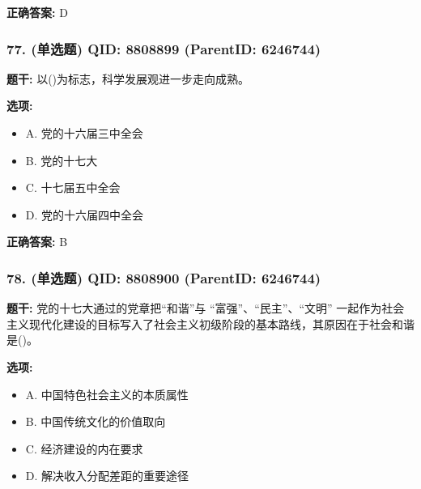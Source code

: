 \documentclass[12pt,UTF8]{ctexart}
\begin{document}
\textbf{正确答案:}
D

\vspace{0.3em}\hrulefill\vspace{0.7em}

\subsubsection*{77. (单选题) \small QID: 8808899 (ParentID: 6246744)}

\textbf{题干:}
以()为标志，科学发展观进一步走向成熟。



\textbf{选项:}
\begin{itemize}[leftmargin=*]

  \item A. 党的十六届三中全会

  \item B. 党的十七大

  \item C. 十七届五中全会

  \item D. 党的十六届四中全会

\end{itemize}

\textbf{正确答案:}
B

\vspace{0.3em}\hrulefill\vspace{0.7em}

\subsubsection*{78. (单选题) \small QID: 8808900 (ParentID: 6246744)}

\textbf{题干:}
党的十七大通过的党章把“和谐”与 “富强”、“民主”、“文明” 一起作为社会主义现代化建设的目标写入了社会主义初级阶段的基本路线，其原因在于社会和谐是()。



\textbf{选项:}
\begin{itemize}[leftmargin=*]

  \item A. 中国特色社会主义的本质属性

  \item B. 中国传统文化的价值取向

  \item C. 经济建设的内在要求

  \item D. 解决收入分配差距的重要途径

\end{itemize}
\end{document}
